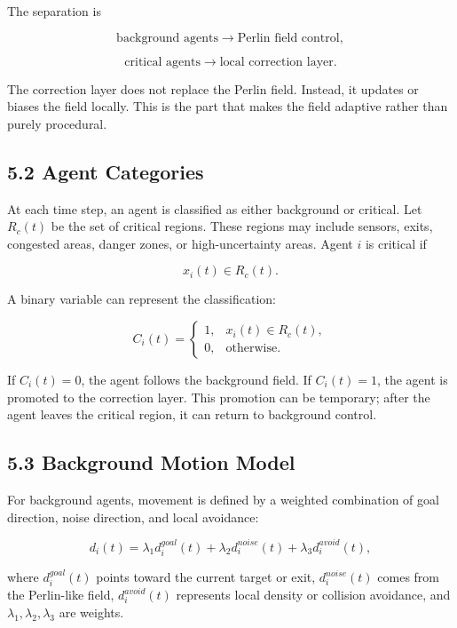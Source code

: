 \documentclass[
  11pt,
]{article}
\begin{document}
The separation is

\[
\text{background agents} \rightarrow \text{Perlin field control},
\]

\[
\text{critical agents} \rightarrow \text{local correction layer}.
\]

The correction layer does not replace the Perlin field. Instead, it
updates or biases the field locally. This is the part that makes the
field adaptive rather than purely procedural.

\subsection{5.2 Agent Categories}\label{agent-categories}

At each time step, an agent is classified as either background or
critical. Let \(R_c(t)\) be the set of critical regions. These regions
may include sensors, exits, congested areas, danger zones, or
high-uncertainty areas. Agent \(i\) is critical if

\[
x_i(t) \in R_c(t).
\]

A binary variable can represent the classification:

\[
C_i(t)
=
\begin{cases}
1, & x_i(t) \in R_c(t), \\
0, & \text{otherwise}.
\end{cases}
\]

If \(C_i(t)=0\), the agent follows the background field. If
\(C_i(t)=1\), the agent is promoted to the correction layer. This
promotion can be temporary; after the agent leaves the critical region,
it can return to background control.

\subsection{5.3 Background Motion Model}\label{background-motion-model}

For background agents, movement is defined by a weighted combination of
goal direction, noise direction, and local avoidance:

\[
d_i(t)
=
\lambda_1 d_i^{goal}(t)
+
\lambda_2 d_i^{noise}(t)
+
\lambda_3 d_i^{avoid}(t),
\]

where \(d_i^{goal}(t)\) points toward the current target or exit,
\(d_i^{noise}(t)\) comes from the Perlin-like field, \(d_i^{avoid}(t)\)
represents local density or collision avoidance, and
\(\lambda_1,\lambda_2,\lambda_3\) are weights.
\end{document}
